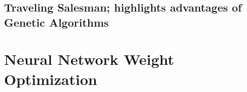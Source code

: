 \documentclass[11pt]{article}
\newcommand{\problemthree}{Traveling Salesman}
\begin{document}
    \subsection{\problemthree \hspace{0em}; highlights advantages of Genetic Algorithms}


    \section{Neural Network Weight Optimization}
    
    
\end{document}
